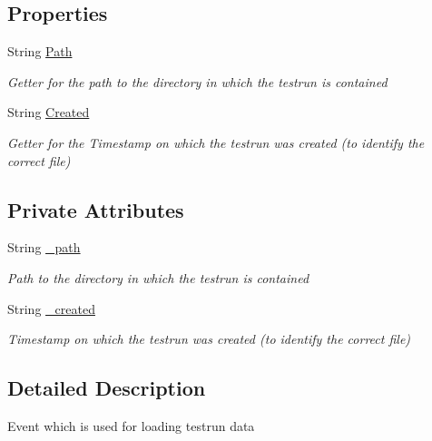 \subsection*{Properties}
\begin{DoxyCompactItemize}
\item 
String \hyperlink{class_web_analyzer_1_1_events_1_1_select_testrun_to_load_event_aa27c59c738823f2dce810a0b8f89259d}{Path}
\begin{DoxyCompactList}\small\item\em Getter for the path to the directory in which the testrun is contained \end{DoxyCompactList}\item 
String \hyperlink{class_web_analyzer_1_1_events_1_1_select_testrun_to_load_event_a330e145816f74dc95033cbd983552ca8}{Created}
\begin{DoxyCompactList}\small\item\em Getter for the Timestamp on which the testrun was created (to identify the correct file) \end{DoxyCompactList}\end{DoxyCompactItemize}
\subsection*{Private Attributes}
\begin{DoxyCompactItemize}
\item 
String \hyperlink{class_web_analyzer_1_1_events_1_1_select_testrun_to_load_event_a27179b9153fc6745c533161d6c1d8e2e}{\+\_\+path}
\begin{DoxyCompactList}\small\item\em Path to the directory in which the testrun is contained \end{DoxyCompactList}\item 
String \hyperlink{class_web_analyzer_1_1_events_1_1_select_testrun_to_load_event_a583a4f909c17711eea42d817cfebeab7}{\+\_\+created}
\begin{DoxyCompactList}\small\item\em Timestamp on which the testrun was created (to identify the correct file) \end{DoxyCompactList}\end{DoxyCompactItemize}


\subsection{Detailed Description}
Event which is used for loading testrun data 



